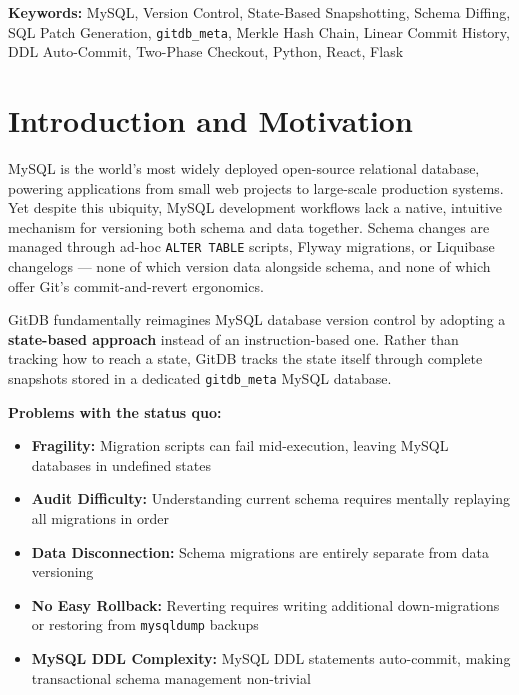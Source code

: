 \documentclass[12pt, a4paper]{article}
\begin{document}
\vspace{1.5em}

\begin{tcolorbox}[infobox]
\textbf{Keywords:} MySQL, Version Control, State-Based Snapshotting, Schema
Diffing, SQL Patch Generation, \texttt{gitdb\_meta}, Merkle Hash Chain, Linear
Commit History, DDL Auto-Commit, Two-Phase Checkout, Python, React, Flask
\end{tcolorbox}

\newpage
\section{Introduction and Motivation}

MySQL is the world's most widely deployed open-source relational database,
powering applications from small web projects to large-scale production systems.
Yet despite this ubiquity, MySQL development workflows lack a native, intuitive
mechanism for versioning both schema and data together. Schema changes are managed
through ad-hoc \texttt{ALTER TABLE} scripts, Flyway migrations, or Liquibase
changelogs --- none of which version data alongside schema, and none of which
offer Git's commit-and-revert ergonomics.

GitDB fundamentally reimagines MySQL database version control by adopting a
\textbf{state-based approach} instead of an instruction-based one. Rather than
tracking how to reach a state, GitDB tracks the state itself through complete
snapshots stored in a dedicated \texttt{gitdb\_meta} MySQL database.

\vspace{0.5em}
\textbf{Problems with the status quo:}

\begin{itemize}[leftmargin=1.5em, itemsep=0.3em]
    \item \textbf{Fragility:} Migration scripts can fail mid-execution, leaving
    MySQL databases in undefined states
    \item \textbf{Audit Difficulty:} Understanding current schema requires
    mentally replaying all migrations in order
    \item \textbf{Data Disconnection:} Schema migrations are entirely separate
    from data versioning
    \item \textbf{No Easy Rollback:} Reverting requires writing additional
    down-migrations or restoring from \texttt{mysqldump} backups
    \item \textbf{MySQL DDL Complexity:} MySQL DDL statements auto-commit,
    making transactional schema management non-trivial
\end{itemize}
\end{document}
